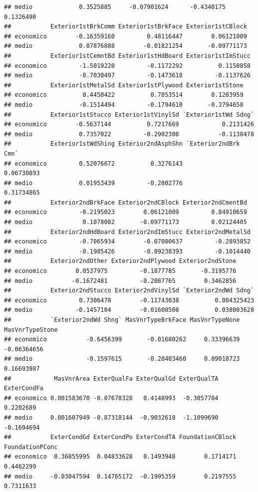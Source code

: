 \documentclass[
]{article}
\begin{document}
\begin{verbatim}
## medio             0.3525885     -0.07901624      -0.4340175          0.1326490
##           Exterior1stBrkComm Exterior1stBrkFace Exterior1stCBlock
## economico        -0.16359160         0.48116447        0.06121009
## medio             0.07876888        -0.01821254       -0.09771173
##           Exterior1stCemntBd Exterior1stHdBoard Exterior1stImStucc
## economico         -1.5019220         -0.1172292          0.1150858
## medio             -0.7030497         -0.1473618         -0.1137626
##           Exterior1stMetalSd Exterior1stPlywood Exterior1stStone
## economico          0.4450422          0.7053514        0.1203959
## medio             -0.1514494         -0.1794610       -0.3794658
##           Exterior1stStucco Exterior1stVinylSd `Exterior1stWd Sdng`
## economico        -0.5637144          0.7217669            0.2131426
## medio             0.7357022         -0.2902308           -0.1138478
##           Exterior1stWdShing Exterior2ndAsphShn `Exterior2ndBrk Cmn`
## economico         0.52076672          0.3276143           0.06730893
## medio             0.01953439         -0.2802776           0.31734865
##           Exterior2ndBrkFace Exterior2ndCBlock Exterior2ndCmentBd
## economico         -0.2195023        0.06121009         0.84910659
## medio              0.1078082       -0.09771173         0.02124405
##           Exterior2ndHdBoard Exterior2ndImStucc Exterior2ndMetalSd
## economico         -0.7065934        -0.07080637         -0.2893852
## medio             -0.1985426        -0.09238393         -0.1014440
##           Exterior2ndOther Exterior2ndPlywood Exterior2ndStone
## economico        0.0537975         -0.1877785       -0.3195776
## medio           -0.1672481         -0.2087765        0.3462856
##           Exterior2ndStucco Exterior2ndVinylSd `Exterior2ndWd Sdng`
## economico         0.7306478        -0.11743038          0.004325423
## medio            -0.1457104        -0.01608508          0.038003628
##           `Exterior2ndWd Shng` MasVnrTypeBrkFace MasVnrTypeNone MasVnrTypeStone
## economico           -0.6456399       -0.01680262     0.33396639     -0.06364656
## medio               -0.1597615       -0.28403460     0.09018723      0.16693987
##            MasVnrArea ExterQualFa ExterQualGd ExterQualTA ExterCondFa
## economico 0.001583670 -0.07678328   0.4148993  -0.3057784   0.2202689
## medio     0.001607949 -0.87318144  -0.9032618  -1.1099690  -0.1694694
##           ExterCondGd ExterCondPo ExterCondTA FoundationCBlock FoundationPConc
## economico  0.36855995  0.04833628   0.1493948        0.1714171       0.4462299
## medio     -0.03047594  0.14765172  -0.1995359        0.2197555       0.7311633

\end{verbatim}
\end{document}

